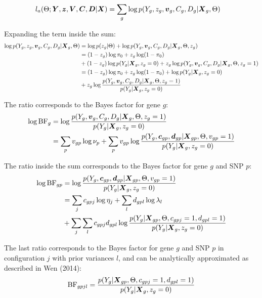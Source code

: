 \documentclass[10pt]{article}
\newcommand{\BF}{{\text{BF}}} %
\newcommand{\dv}{\bm{d}}
\newcommand{\cv}{\mbox{\boldmath$c$}}
\newcommand{\Cv}{\mbox{\boldmath$C$}}
\newcommand{\Dv}{\mbox{\boldmath$D$}}
\newcommand{\vv}{\mbox{\boldmath$v$}}
\newcommand{\Xv}{\mbox{\boldmath$X$}}
\newcommand{\Vv}{\mbox{\boldmath$V$}}
\newcommand{\Yv}{\mbox{\boldmath$Y$}}
\newcommand{\zv}{\mbox{\boldmath$z$}}
\begin{document}
\begin{equation*}
  \begin{aligned}
    l_a(\Theta;\Yv,\zv,\Vv,\Cv,\Dv|\Xv) &= \sum_g \log p(Y_g,z_g,\vv_g,C_g,D_g | \Xv_g,\Theta)
  \end{aligned}
\end{equation*}

Expanding the term inside the sum:
\begin{equation*}
  \begin{aligned}
    \log p(Y_g,z_g,\vv_g,C_g,D_g | \Xv_g,\Theta) &= \log p(z_g | \Theta) + \log p(Y_g,\vv_g,C_g,D_g | \Xv_g,\Theta,z_g)\\
    &= (1-z_g) \log \pi_0 + z_g \log (1-\pi_0) \\
    &+ (1-z_g) \log p(Y_g|\Xv_g,z_g=0) + z_g \log p(Y_g,\vv_g,C_g,D_g | \Xv_g,\Theta,z_g=1) \\
    &= (1-z_g) \log \pi_0 + z_g \log (1-\pi_0) + \log p(Y_g|\Xv_g,z_g=0) \\
    &+ z_g \log \frac{p(Y_g,\vv_g,C_g,D_g | \Xv_g,\Theta,z_g=1)}{p(Y_g|\Xv_g,z_g=0)}
  \end{aligned}
\end{equation*}

The ratio corresponds to the Bayes factor for gene $g$:
\begin{equation*}
  \begin{aligned}
    \log \BF_g &= \log \frac{p(Y_g,\vv_g,C_g,D_g | \Xv_g,\Theta,z_g=1)}{p(Y_g|\Xv_g,z_g=0)} \\
    &= \sum_p v_{gp} \log \nu_p + \sum_p v_{gp} \log \frac{p(Y_g,\cv_{gp},\dv_{gp} | \Xv_{gp},\Theta,v_{gp}=1)}{p(Y_g|\Xv_g,z_g=0)}
  \end{aligned}
\end{equation*}

The ratio inside the sum corresponds to the Bayes factor for gene $g$ and SNP $p$:
\begin{equation*}
  \begin{aligned}
    \log \BF_{gp} &= \log \frac{p(Y_g,\cv_{gp},\dv_{gp} | \Xv_{gp},\Theta,v_{gp}=1)}{p(Y_g|\Xv_g,z_g=0)} \\
    &= \sum_j c_{gpj} \log \eta_j + \sum_l d_{gpl} \log \lambda_l \\
    &+ \sum_j \sum_l c_{gpj} d_{gpl} \log \frac{p(Y_g | \Xv_{gp},\Theta,c_{gpj}=1,d_{gpl}=1)}{p(Y_g|\Xv_g,z_g=0)}
  \end{aligned}
\end{equation*}

The last ratio corresponds to the Bayes factor for gene $g$ and SNP $p$ in configuration $j$ with prior variances $l$, and can be analytically approximated as described in Wen (2014):
\begin{equation*}
  \BF_{gpjl} = \frac{p(Y_g | \Xv_{gp},\Theta,c_{gpj}=1,d_{gpl}=1)}{p(Y_g|\Xv_g,z_g=0)}  
\end{equation*}
\end{document}
